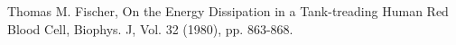 \begin{thebibliography}{10}

    Thomas M. Fischer,
    On the Energy Dissipation in a Tank-treading Human Red Blood Cell,
    Biophys. J,
    Vol. 32 (1980), pp. 863-868.
\end{thebibliography}

